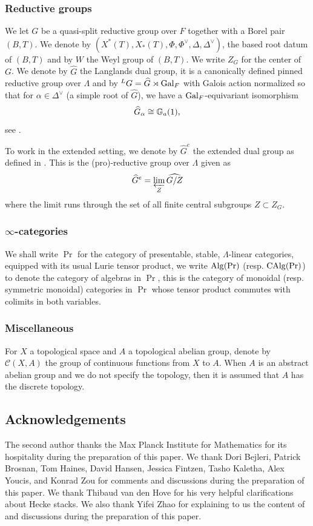 \subsubsection{Reductive groups}

We let $G$ be a quasi-split reductive group over $F$ together with a Borel pair $(B,T)$. We denote by $(X^*(T), X_*(T), \Phi, \Phi^{\vee}, \Delta, \Delta^{\vee})$, the based root datum of $(B,T)$ and by $W$ the Weyl group of $(B,T)$. We write $Z_G$ for the center of $G$.
We denote by $\widehat{G}$ the Langlands dual group, it is a canonically defined pinned reductive group over $\Lambda$ and by ${^L}G = \widehat{G} \rtimes \mathrm{Gal}_F$ with Galois action normalized so that for $\alpha \in \Delta^{\vee}$ (a simple root of $\widehat{G}$), we have a $\mathrm{Gal}_F$-equivariant isomorphism 
$$\widehat{G}_{\alpha} \cong \mathbb{G}_a(1),$$
see \cite[Section VI.11]{Geometrization}.

To work in the extended setting, we denote by $\widehat{G}^e$ the extended dual group as defined in \cite[\S 12.1]{Fargues22}. This is the (pro)-reductive group over $\Lambda$ given as
$$\widehat{G}^e = \varprojlim_Z \widehat{G/Z}$$
where the limit runs through the set of all finite central subgroups $Z \subset Z_{G}$.

\subsubsection{$\infty$-categories}

We shall write $\Pr$ for the category of presentable, stable, $\Lambda$-linear categories, equipped with its usual Lurie tensor product, we write $\mathrm{Alg}(\Pr)$ (resp. $\mathrm{CAlg}(\Pr)$) to denote the category of algebras in $\Pr$, this is the category of monoidal (resp. symmetric monoidal) categories in $\Pr$ whose tensor product commutes with colimits in both variables.

\subsubsection{Miscellaneous}
For $X$ a topological space and $A$ a topological abelian group, denote by $\mathcal{C}(X,A)$ the group of continuous functions from $X$ to $A$. When $A$ is an abstract abelian group and we do not specify the topology, then it is assumed that $A$ has the discrete topology.

\subsection{Acknowledgements}
The second author thanks the Max Planck Institute for Mathematics for its hospitality during the preparation of this paper. We thank Dori Bejleri, Patrick Brosnan, Tom Haines, David Hansen, Jessica Fintzen, Tasho Kaletha, Alex Youcis, and Konrad Zou for comments and discussions during the preparation of this paper. We thank Thibaud van den Hove for his very helpful clarifications about Hecke stacks. We also thank Yifei Zhao for explaining to us the content of \cite{GLCV} and discussions during the preparation of this paper. 


